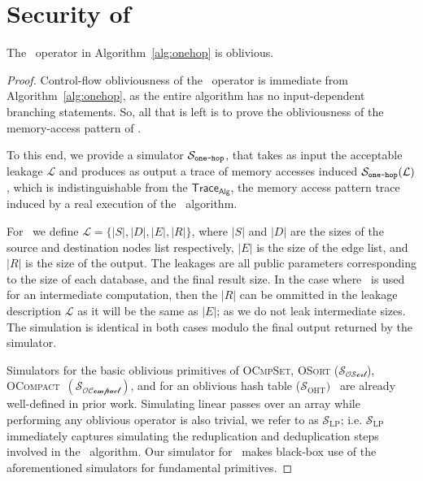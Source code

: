 \section{Security of \system}
\label{sec:security}

\begin{theorem}
The \onehop\ operator in Algorithm~\ref{alg:onehop} is oblivious.
\end{theorem}

\begin{proof}
Control-flow obliviousness of the \onehop\ operator is immediate from Algorithm~\ref{alg:onehop}, as the entire algorithm has no input-dependent branching statements. 
So, all that is left is to prove the obliviousness of the memory-access pattern of \onehop. 

To this end, we provide a simulator $\mathcal{S}_{\texttt{one-hop}}$, that takes as input the acceptable leakage
$\mathcal{L}$ and produces as output a trace of memory accesses induced $\mathcal{S_{\texttt{one-hop}}}(\mathcal{L})$, which is indistinguishable from the $\mathsf{Trace}_{\mathsf{Alg}}$, the memory access pattern trace induced by a real execution of the \onehop\ algorithm.


For \onehop\, we define $\mathcal{L} = \{ |S|, |D|, |E|, |R|\}$, where
$|S|$ and $|D|$ are the sizes of the source and destination nodes list respectively,
$|E|$ is the size of the edge list, and
$|R|$ is the size of the output.
The leakages are all public parameters corresponding to the size of each database, and the final result size.
In the case where \onehop\ is used for an intermediate computation, then the $|R|$ can be ommitted in the leakage description $\mathcal{L}$ as it will be the same as $|E|$; as we do not leak intermediate sizes. 
The simulation is identical in both cases modulo the final output returned by the simulator.

Simulators for the basic oblivious primitives of \textsc{OCmpSet}, \textsc{OSort}
($\mathcal{S_{\text{OSort}}}$), \textsc{OCompact}~\cite{sasy2022fast}$(\mathcal{S_{\text{OCompact}}})$, and for an oblivious hash table ($\mathcal{S}_{\text{OHT}})$~\cite{zheng2025h2o2ram} are already well-defined in prior work.
Simulating linear passes over an array while performing any oblivious operator is also trivial, we refer to as $\mathcal{S}_{\text{LP}}$; i.e. $\mathcal{S}_{\text{LP}}$ immediately captures simulating the reduplication and deduplication steps involved in the \onehop\ algorithm.
Our simulator for \onehop\ makes black-box use of the aforementioned simulators for fundamental primitives.


\end{proof}
